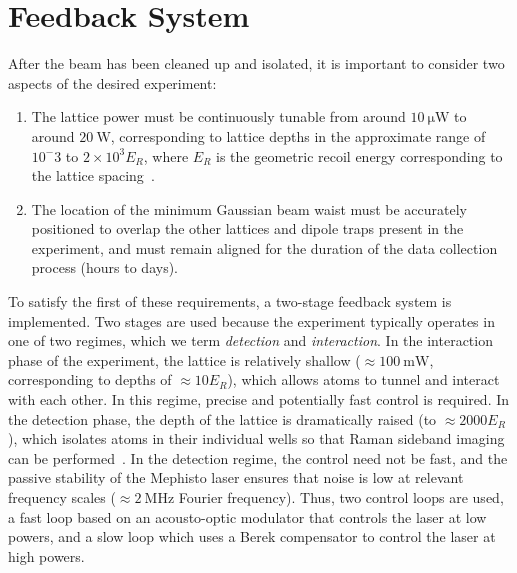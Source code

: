\documentclass[twocolumn,aps,pra,showpacs,preprintnumbers,bibnotes]{revtex4-1}
\newcommand\unit[2]{\ensuremath{#1~\mathrm{{#2}}}}
\begin{document}
\section{Feedback System}

After the beam has been cleaned up and isolated, it is important to consider two aspects of the desired experiment:
\begin{enumerate}
\item The lattice power must be continuously tunable from around \unit{10}{\mu{}W} to around \unit{20}{W}, corresponding to lattice depths in the approximate range of $10^-3$ to $2 \times 10^3 E_R$, where $E_R$ is the geometric recoil energy corresponding to the lattice spacing~\cite{Blatt2015}.
\item The location of the minimum Gaussian beam waist must be accurately positioned to overlap the other lattices and dipole traps present in the experiment, and must remain aligned for the duration of the data collection process (hours to days).
\end{enumerate}
To satisfy the first of these requirements, a two-stage feedback system is implemented.
Two stages are used because the experiment typically operates in one of two regimes, which we term \emph{detection} and \emph{interaction}.
In the interaction phase of the experiment, the lattice is relatively shallow ($\approx \unit{100}{mW}$, corresponding to depths of $\approx 10 E_R$), which allows atoms to tunnel and interact with each other.
In this regime, precise and potentially fast control is required.
In the detection phase, the depth of the lattice is dramatically raised (to $\approx 2000 E_R$), which isolates atoms in their individual wells so that Raman sideband imaging can be performed~\cite{Parsons2015}.
In the detection regime, the control need not be fast, and the passive stability of the Mephisto laser ensures that noise is low at relevant frequency scales ($\approx\unit{2}{MHz}$ Fourier frequency).
Thus, two control loops are used, a fast loop based on an acousto-optic modulator that controls the laser at low powers, and a slow loop which uses a Berek compensator to control the laser at high powers.
\end{document}
